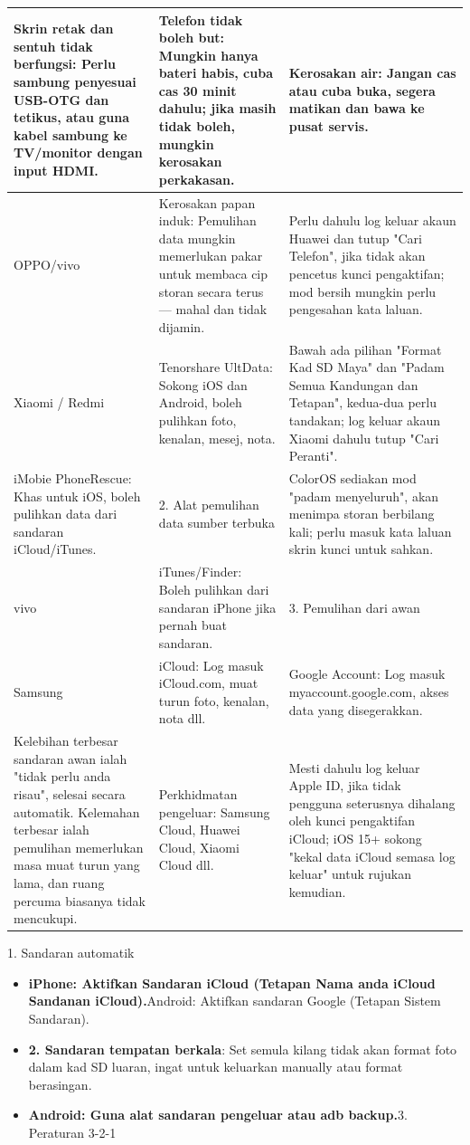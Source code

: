 \begin{center}
\begin{tabularx}{\linewidth}{|X|X|X|}
\hline
\textbf{Skrin retak dan sentuh tidak berfungsi: Perlu sambung penyesuai USB-OTG dan tetikus, atau guna kabel sambung ke TV/monitor dengan input HDMI.} & \textbf{Telefon tidak boleh but: Mungkin hanya bateri habis, cuba cas 30 minit dahulu; jika masih tidak boleh, mungkin kerosakan perkakasan.} & \textbf{Kerosakan air: Jangan cas atau cuba buka, segera matikan dan bawa ke pusat servis.} \tabularnewline
\hline
OPPO/vivo & Kerosakan papan induk: Pemulihan data mungkin memerlukan pakar untuk membaca cip storan secara terus — mahal dan tidak dijamin. & Perlu dahulu log keluar akaun Huawei dan tutup "Cari Telefon", jika tidak akan pencetus kunci pengaktifan; mod bersih mungkin perlu pengesahan kata laluan. \tabularnewline
Xiaomi / Redmi & Tenorshare UltData: Sokong iOS dan Android, boleh pulihkan foto, kenalan, mesej, nota. & Bawah ada pilihan "Format Kad SD Maya" dan "Padam Semua Kandungan dan Tetapan", kedua-dua perlu tandakan; log keluar akaun Xiaomi dahulu tutup "Cari Peranti". \tabularnewline
iMobie PhoneRescue: Khas untuk iOS, boleh pulihkan data dari sandaran iCloud/iTunes. & 2. Alat pemulihan data sumber terbuka & ColorOS sediakan mod "padam menyeluruh", akan menimpa storan berbilang kali; perlu masuk kata laluan skrin kunci untuk sahkan. \tabularnewline
vivo & iTunes/Finder: Boleh pulihkan dari sandaran iPhone jika pernah buat sandaran. & 3. Pemulihan dari awan \tabularnewline
Samsung & iCloud: Log masuk iCloud.com, muat turun foto, kenalan, nota dll. & Google Account: Log masuk myaccount.google.com, akses data yang disegerakkan. \tabularnewline
Kelebihan terbesar sandaran awan ialah "tidak perlu anda risau", selesai secara automatik. Kelemahan terbesar ialah pemulihan memerlukan masa muat turun yang lama, dan ruang percuma biasanya tidak mencukupi. & Perkhidmatan pengeluar: Samsung Cloud, Huawei Cloud, Xiaomi Cloud dll. & Mesti dahulu log keluar Apple ID, jika tidak pengguna seterusnya dihalang oleh kunci pengaktifan iCloud; iOS 15+ sokong "kekal data iCloud semasa log keluar" untuk rujukan kemudian. \tabularnewline
\hline
\end{tabularx}
\end{center}

\begin{tcbwarn}{1. Sandaran automatik}
\begin{itemize}
  \item \textbf{iPhone: Aktifkan Sandaran iCloud (Tetapan Nama anda iCloud Sandanan iCloud).}Android: Aktifkan sandaran Google (Tetapan Sistem Sandaran).
  \item \textbf{2. Sandaran tempatan berkala}: Set semula kilang tidak akan format foto dalam kad SD luaran, ingat untuk keluarkan manually atau format berasingan.
  \item \textbf{Android: Guna alat sandaran pengeluar atau adb backup.}3. Peraturan 3-2-1
\end{itemize}

\end{tcbwarn}

